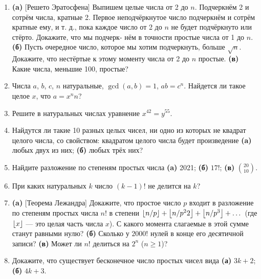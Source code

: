 \begin{enumerate}
\item \textbf{(a)} [Решето Эратосфена] Выпишем целые числа от 2 до $n$. Подчеркнём
 2 и сотрём числа, кратные 2. Первое неподчёркнутое число
подчеркнём и сотрём кратные ему, и т. д., пока каждое число от 2
до $n$ не будет подчёркнуто или стёрто. Докажите, что мы подчерк-
нём в точности простые числа от 1 до $n$. \textbf{(б)} Пусть очередное число,
которое мы хотим подчеркнуть, больше $\sqrt n$. Докажите, что нестёртые к этому моменту
 числа от 2 до $n$ простые. \textbf{(в)} Какие числа, меньшие 100, простые?

\item Числа $a$, $b$, $c$, $n$ натуральные, $\gcd(a, b) = 1$, $ab = c^n$. Найдется ли
такое целое $x$, что $a = x^nn$?

\item Решите в натуральных числах уравнение $x^{42} = y^{55}$.
\item Найдутся ли такие 10 разных целых чисел, ни одно из которых
не квадрат целого числа, со свойством: квадратом целого числа
будет произведение \textbf{(a)} любых двух из них; \textbf{(б)} любых трёх них?

\item  Найдите разложение по степеням простых числа \textbf{(a)} 2021; \textbf{(б)} $17!$; \textbf{(в)} $\binom{20}{10}$.

\item При каких натуральных $k$ число $(k - 1)!$ не делится на $k$?

\item \textbf{(a)} [Теорема Лежандра] Докажите, что простое число $p$ входит
в разложение по степеням простых числа $n!$ в степени
$\left\lfloor n/p\right\rfloor+\left\lfloor n/p^22\right\rfloor+\left\lfloor n/p^3\right\rfloor+\dots$ (где $\left\lfloor x\right\rfloor$ --- это целая часть числа $x$).
С какого момента слагаемые в этой сумме станут равными нулю?
\textbf{(б)} Сколько у $2000!$ нулей в конце его десятичной записи? \textbf{(в)} Может
ли $n!$ делиться на $2^n$ ($n \ge 1$)?

\item Докажите, что существует бесконечное число простых чисел
вида \textbf{(а)} $3k + 2$; \textbf{(б)} $4k + 3$.

\end{enumerate}

